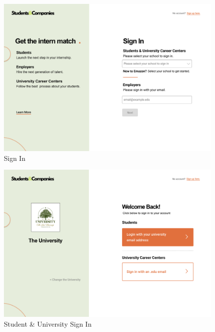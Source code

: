 \documentclass{article}
\begin{document}
\begin{figure}[H]
    \centering
    \includegraphics[scale = 0.40]{figures/Sign In.png}
    \caption{Sign In}
     \centering
\end{figure}

\begin{figure}[H]
    \centering
    \includegraphics[scale = 0.40]{figures/Student Sign In.png}
    \caption{Student \& University Sign In}
     \centering
\end{figure}
    
\end{document}
